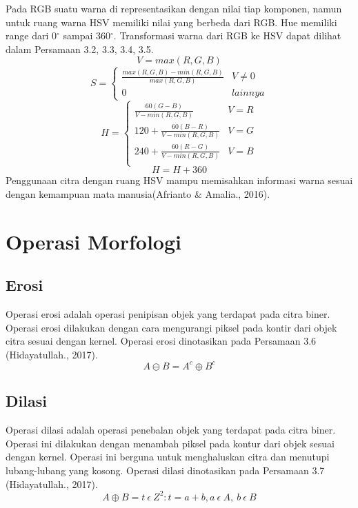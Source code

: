 Pada RGB suatu warna di representasikan dengan nilai tiap komponen, namun untuk ruang warna HSV memiliki nilai yang berbeda dari RGB. Hue memiliki range dari 0$^\circ$ sampai 360$^\circ$. Transformasi warna dari RGB ke HSV dapat dilihat dalam Persamaan 3.2, 3.3, 3.4, 3.5.
\begin{equation}
	V = max(R,G,B)
\end{equation}
\begin{equation}
	S=
	\begin{cases}
	\frac{max(R,G,B) - min(R,G,B)}{max(R,G,B)} &  V \ne 0\\
	0 & lainnya
	\end{cases} 	
\end{equation}
\begin{equation}
	H=
	\begin{cases}
	\frac{60(G-B)}{V-min(R,G,B)} &  V=R \\
	120+\frac{60(B-R)}{V-min(R,G,B)} &  V=G \\
	240+\frac{60(R-G)}{V-min(R,G,B)} &  V=B \\
	\end{cases}
\end{equation}
\begin{equation}
	H = H+360
\end{equation}
Penggunaan citra dengan ruang HSV mampu memisahkan informasi warna sesuai dengan kemampuan mata manusia(Afrianto \& Amalia., 2016).
\section{Operasi Morfologi}
\subsection{Erosi}
Operasi erosi adalah operasi penipisan objek yang terdapat pada citra biner. Operasi erosi dilakukan dengan cara mengurangi piksel pada kontir dari objek citra sesuai dengan kernel. Operasi erosi dinotasikan pada Persamaan 3.6 (Hidayatullah., 2017).
\begin{equation}
A \ominus B = A^c \oplus B^c
\end{equation}
\subsection{Dilasi}
Operasi dilasi adalah operasi penebalan  objek yang terdapat pada citra biner. Operasi ini dilakukan dengan menambah piksel pada kontur dari objek sesuai dengan kernel. Operasi ini berguna untuk menghaluskan citra dan menutupi lubang-lubang yang kosong. Operasi dilasi dinotasikan pada Persamaan 3.7 (Hidayatullah., 2017).
\begin{equation}
A \oplus B = t \ \epsilon \ Z^2 : t = a + b, a \ \epsilon \ A, \ b \ \epsilon \ B
\end{equation}

